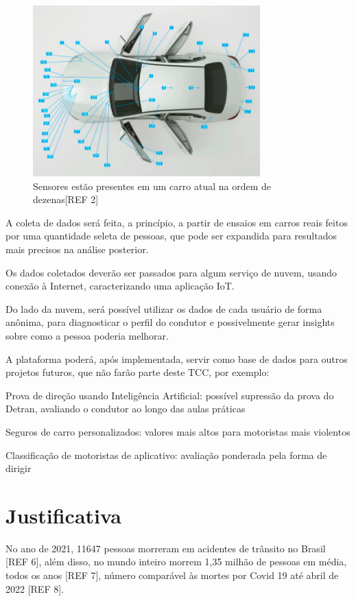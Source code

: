 \begin{figure}[hp]
    \centering
    
    \includegraphics[]{figures/sensores_carro.png}
    
    \caption{Sensores estão presentes em um carro atual na ordem de dezenas[REF 2]}
\end{figure}

A coleta de dados será feita, a princípio, a partir de ensaios em carros reais feitos por uma quantidade seleta de pessoas, que pode ser expandida para resultados mais precisos na análise posterior.

Os dados coletados deverão ser passados para algum serviço de nuvem, usando conexão à Internet, caracterizando uma aplicação IoT.
	
Do lado da nuvem, será possível utilizar os dados de cada usuário de forma anônima, para diagnosticar o perfil do condutor e possivelmente gerar insights sobre como a pessoa poderia melhorar.
	
A plataforma poderá, após implementada, servir como base de dados para outros projetos futuros, que não farão parte deste TCC, por exemplo:

Prova de direção usando Inteligência Artificial: possível supressão da prova do Detran, avaliando o condutor ao longo das aulas práticas

Seguros de carro personalizados: valores mais altos para motoristas mais violentos

Classificação de motoristas de aplicativo: avaliação ponderada pela forma de dirigir

 
\section{Justificativa}
No ano de 2021, 11647 pessoas morreram em acidentes de trânsito no Brasil [REF 6], além disso, no mundo inteiro morrem 1,35 milhão de pessoas em média, todos os anos [REF 7], número comparável às mortes por Covid 19 até abril de 2022 [REF 8].

